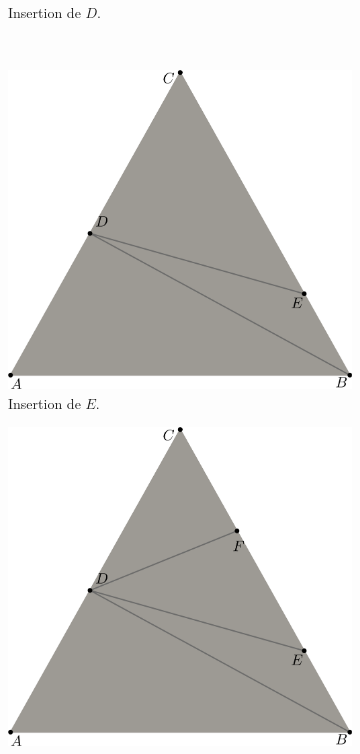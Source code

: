 \begin{figure}[h!]
\begin{subfigure}{0.45\textwidth}
    \caption{Insertion de $D$.}
    \label{fig:exemple_insert_pt_1}
\end{subfigure}
\\[0.1cm]
\begin{subfigure}{0.45\textwidth}
    \includegraphics[width=\textwidth]{images/decoup_triangle-2.pdf}
    \caption{Insertion de $E$.}
    \label{fig:exemple_insert_pt_2}
\end{subfigure}
\hfill
\begin{subfigure}{0.45\textwidth}
    \includegraphics[width=\textwidth]{images/decoup_triangle-3.pdf}

\end{subfigure}
\end{figure}
